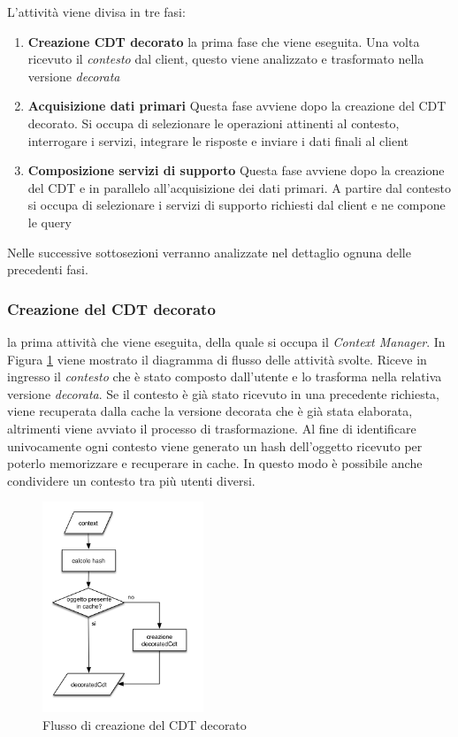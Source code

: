 L'attività viene divisa in tre fasi:

\begin{enumerate}
	\item \textbf{Creazione CDT decorato}
	\upe la prima fase che viene eseguita. Una volta ricevuto il \emph{contesto} dal client, questo viene analizzato e trasformato nella versione \emph{decorata}
	\item \textbf{Acquisizione dati primari}
	Questa fase avviene dopo la creazione del CDT decorato. Si occupa di selezionare le operazioni attinenti al contesto, interrogare i servizi, integrare le risposte e inviare i dati finali al client
	\item \textbf{Composizione servizi di supporto}
	Questa fase avviene dopo la creazione del CDT e in parallelo all'acquisizione dei dati primari. A partire dal contesto si occupa di selezionare i servizi di supporto richiesti dal client e ne compone le query
\end{enumerate}

Nelle successive sottosezioni verranno analizzate nel dettaglio ognuna delle precedenti fasi.

\subsubsection*{Creazione del CDT decorato}

\upe la prima attività che viene eseguita, della quale si occupa il \emph{Context Manager}. In Figura \ref{fig:flusso-decorated-cdt} viene mostrato il diagramma di flusso delle attività svolte. Riceve in ingresso il \emph{contesto} che è stato composto dall'utente e lo trasforma nella relativa versione \emph{decorata}. Se il contesto è già stato ricevuto in una precedente richiesta, viene recuperata dalla cache la versione decorata che è già stata elaborata, altrimenti viene avviato il processo di trasformazione. Al fine di identificare univocamente ogni contesto viene generato un hash dell'oggetto ricevuto per poterlo memorizzare e recuperare in cache. In questo modo è possibile anche condividere un contesto tra più utenti diversi.

\begin{figure}[ht]
	\centering
	\includegraphics[width=0.43\textwidth]{4-progettazione-alto-livello/Immagini/diagramma_flusso_decoratedCdt.png}
	\caption{Flusso di creazione del CDT decorato\label{fig:flusso-decorated-cdt}}
\end{figure}

